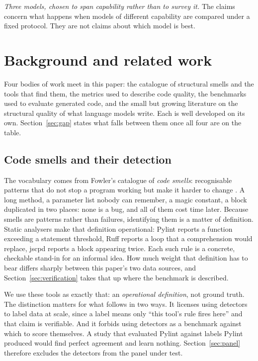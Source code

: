 \documentclass[10pt,a4paper,twocolumn]{article}
\begin{document}
\emph{Three models, chosen to span capability rather than to survey it.} The
claims concern what happens when models of different capability are compared
under a fixed protocol. They are not claims about which model is best.

\section{Background and related work}
\label{sec:related}

Four bodies of work meet in this paper: the catalogue of structural smells and
the tools that find them, the metrics used to describe code quality, the
benchmarks used to evaluate generated code, and the small but growing literature
on the structural quality of what language models write. Each is well developed
on its own. Section~\ref{sec:gap} states what falls between them once all four
are on the table.

\subsection{Code smells and their detection}

The vocabulary comes from Fowler's catalogue of \emph{code smells}: recognisable
patterns that do not stop a program working but make it harder to change
\cite{fowler1999refactoring}. A long method, a parameter list nobody can
remember, a magic constant, a block duplicated in two places: none is a bug, and
all of them cost time later. Because smells are patterns rather than failures, identifying them is a matter
of definition. Static analysers make that definition operational: Pylint reports
a function exceeding a statement threshold, Ruff reports a loop that a
comprehension would replace, jscpd reports a block appearing twice. Each such
rule is a concrete, checkable stand-in for an informal idea. How much weight
that definition has to bear differs sharply between this paper's two data
sources, and Section~\ref{sec:verification} takes that up where the benchmark is
described.

We use these tools as exactly that: an \emph{operational definition}, not ground
truth. The distinction matters for what follows in two ways. It licenses using
detectors to label data at scale, since a label means only ``this tool's rule
fires here'' and that claim is verifiable. And it forbids using detectors as a
benchmark against which to score themselves. A study that evaluated Pylint
against labels Pylint produced would find perfect agreement and learn nothing.
Section~\ref{sec:panel} therefore excludes the detectors from the panel under
test.
\end{document}
